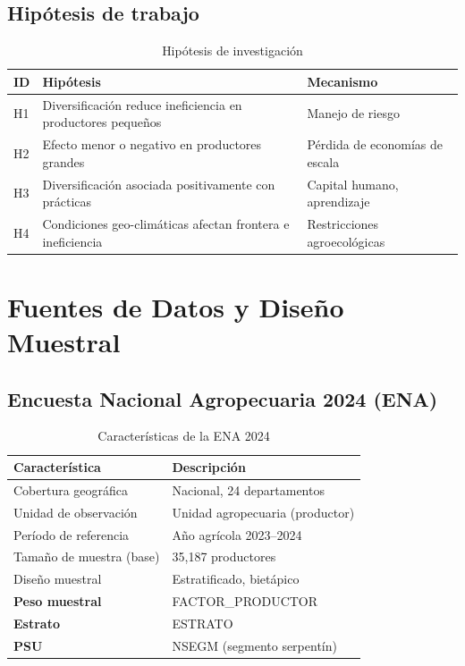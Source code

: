 \documentclass[11pt,a4paper]{article}
\begin{document}
\subsection{Hipótesis de trabajo}
\begin{table}[H]
\centering
\caption{Hipótesis de investigación}
\label{tab:hipotesis}
\begin{threeparttable}
\small
\begin{tabular}{p{1.2cm}p{9cm}p{3.5cm}}
\toprule
\textbf{ID} & \textbf{Hipótesis} & \textbf{Mecanismo} \\
\midrule
H1 & Diversificación reduce ineficiencia en productores pequeños & Manejo de riesgo \\
H2 & Efecto menor o negativo en productores grandes & Pérdida de economías de escala \\
H3 & Diversificación asociada positivamente con prácticas & Capital humano, aprendizaje \\
H4 & Condiciones geo-climáticas afectan frontera e ineficiencia & Restricciones agroecológicas \\
\bottomrule
\end{tabular}
\end{threeparttable}
\end{table}

\section{Fuentes de Datos y Diseño Muestral}

\subsection{Encuesta Nacional Agropecuaria 2024 (ENA)}

\begin{table}[H]
\centering
\caption{Características de la ENA 2024}
\label{tab:ena_overview}
\begin{threeparttable}
\small
\begin{tabular}{ll}
\toprule
\textbf{Característica} & \textbf{Descripción} \\
\midrule
Cobertura geográfica & Nacional, 24 departamentos \\
Unidad de observación & Unidad agropecuaria (productor) \\
Período de referencia & Año agrícola 2023--2024 \\
Tamaño de muestra (base) & 35,187 productores \\
Diseño muestral & Estratificado, bietápico \\
\midrule
\textbf{Peso muestral} & FACTOR\_PRODUCTOR \\
\textbf{Estrato} & ESTRATO \\
\textbf{PSU} & NSEGM (segmento serpentín) \\
\bottomrule
\end{tabular}
\end{threeparttable}
\end{table}
\end{document}
